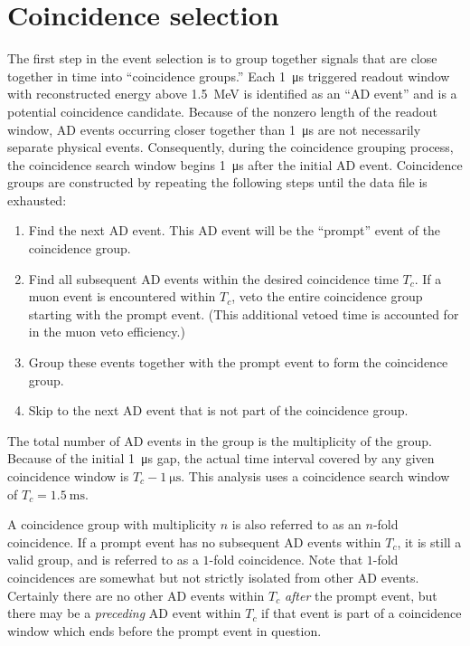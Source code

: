 \documentclass{ucbthesis}
\newcommand{\tc}{\ensuremath{T_c}}
\newcommand{\fold}[1]{\ensuremath{#1}-fold}
\begin{document}
\section{Coincidence selection}

The first step in the event selection is
to group together signals that are close together in time
into ``coincidence groups.''
Each \SI{1}{\micro\second} triggered readout window
with reconstructed energy above \SI{1.5}{\mega\electronvolt}
is identified as an ``AD event''
and is a potential coincidence candidate.
Because of the nonzero length of the readout window,
AD events occurring closer together than \SI{1}{\micro\second}
are not necessarily separate physical events.
Consequently, during the coincidence grouping process,
the coincidence search window begins \SI{1}{\micro\second}
after the initial AD event.
Coincidence groups are constructed by repeating the following steps
until the data file is exhausted:

\begin{enumerate}
    \item Find the next AD event.
        This AD event will be the ``prompt'' event of the coincidence group.
    \item Find all subsequent AD events within the desired coincidence time \tc.
        If a muon event is encountered within \tc,
        veto the entire coincidence group starting with the prompt event.
        (This additional vetoed time is accounted for in the muon veto efficiency.)
    \item Group these events together with the prompt event
        to form the coincidence group.
    \item Skip to the next AD event that is not part of the coincidence group.
\end{enumerate}

The total number of AD events in the group
is the multiplicity of the group.
Because of the initial \SI{1}{\micro\second} gap,
the actual time interval covered by any given coincidence window is
$\tc - \SI{1}{\micro\second}$.
This analysis uses a coincidence search window of $\tc = \SI{1.5}{\milli\second}$.

A coincidence group with multiplicity $n$ is also referred to
as an \fold{n} coincidence.
If a prompt event has no subsequent AD events within \tc, it is
still a valid group, and is referred to as a \fold{1} coincidence.
Note that \fold{1} coincidences are somewhat but not strictly isolated
from other AD events.
Certainly there are no other AD events
within \tc{} \textit{after} the prompt event,
but there may be a \textit{preceding} AD event within \tc{}
if that event is part of a coincidence window
which ends before the prompt event in question.
\end{document}
